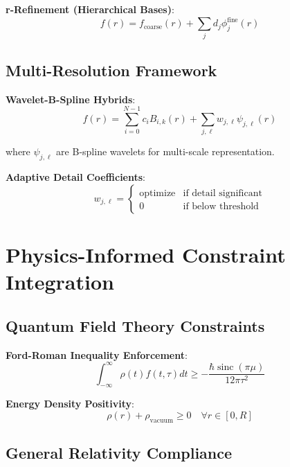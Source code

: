 \documentclass[11pt,a4paper]{article}
\begin{document}
\textbf{r-Refinement (Hierarchical Bases)}:
\begin{equation}
f(r) = f_{\text{coarse}}(r) + \sum_j d_j \phi_j^{\text{fine}}(r)
\end{equation}

\subsection{Multi-Resolution Framework}

\textbf{Wavelet-B-Spline Hybrids}:
\begin{equation}
f(r) = \sum_{i=0}^{N-1} c_i B_{i,k}(r) + \sum_{j,\ell} w_{j,\ell} \psi_{j,\ell}(r)
\end{equation}

where $\psi_{j,\ell}$ are B-spline wavelets for multi-scale representation.

\textbf{Adaptive Detail Coefficients}:
\begin{equation}
w_{j,\ell} = \begin{cases}
\text{optimize} & \text{if detail significant} \\
0 & \text{if below threshold}
\end{cases}
\end{equation}

\section{Physics-Informed Constraint Integration}

\subsection{Quantum Field Theory Constraints}

\textbf{Ford-Roman Inequality Enforcement}:
\begin{equation}
\int_{-\infty}^{\infty} \rho(t) f(t, \tau) dt \geq -\frac{\hbar \operatorname{sinc}(\pi\mu)}{12\pi\tau^2}
\end{equation}

\textbf{Energy Density Positivity}:
\begin{equation}
\rho(r) + \rho_{\text{vacuum}} \geq 0 \quad \forall r \in [0, R]
\end{equation}

\subsection{General Relativity Compliance}
\end{document}
